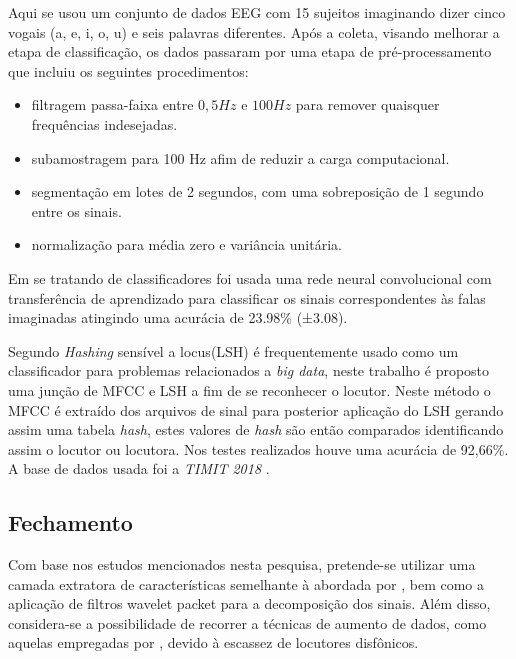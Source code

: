 \documentclass[a4paper,12pt,openright,oneside]{book}
\newenvironment{myenv}[1]
  {\begin{spacing}{#1}}
  {\end{spacing}}
\begin{document}
\begin{myenv}{1.5}
				\par Aqui \cite{tamm2020classification} se usou um conjunto de dados EEG com 15 sujeitos imaginando dizer cinco vogais (a, e, i, o, u) e seis palavras diferentes. Após a coleta, visando melhorar a etapa de classificação, os dados passaram por uma etapa de pré-processamento que incluiu os seguintes procedimentos:
				\begin{itemize}
					\item filtragem passa-faixa entre $0,5Hz$ e $100Hz$ para remover quaisquer frequências indesejadas.
					\item subamostragem para 100 Hz afim de reduzir a carga computacional.
					\item segmentação em lotes de 2 segundos, com uma sobreposição de 1 segundo entre os sinais.
					\item normalização para média zero e variância unitária.
				\end{itemize}
				Em se tratando de classificadores foi usada uma rede neural convolucional com transferência de aprendizado para classificar os sinais correspondentes às falas imaginadas atingindo uma acurácia de 23.98\% (±3.08).\newline
				
				\par Segundo \cite{8396208} \textit{Hashing} sensível a locus(LSH) é frequentemente usado como um classificador para problemas relacionados a \textit{big data}, neste trabalho é proposto uma junção de MFCC e LSH a fim de se reconhecer o locutor. Neste método o MFCC é extraído dos arquivos de sinal para posterior aplicação do LSH gerando assim uma tabela \textit{hash}, estes valores de \textit{hash} são então comparados identificando assim o locutor ou locutora. Nos testes realizados houve uma acurácia de 92,66\%. A base de dados usada foi a \textit{TIMIT 2018} \cite{TIMIT2018}.
				
				
				\subsection{Fechamento}
				
					\par Com base nos estudos mencionados nesta pesquisa, pretende-se utilizar uma camada extratora de características semelhante à abordada por \cite{WOS:000841879504172}, bem como a aplicação de filtros wavelet packet para a decomposição dos sinais. Além disso, considera-se a possibilidade de recorrer a técnicas de aumento de dados, como aquelas empregadas por \cite{jin21_interspeech}, devido à escassez de locutores disfônicos.
					

\end{myenv}
\end{document}
